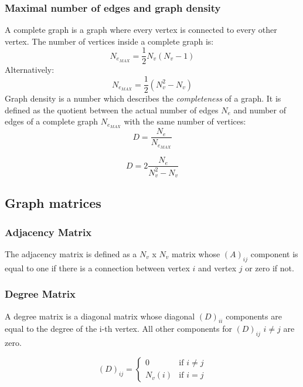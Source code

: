 \documentclass[a4paper,twoside, openright,12pt]{report}
\begin{document}
\subsubsection{Maximal number of edges and graph density}
A complete graph is a graph where every vertex is connected to every other vertex. 
The number of vertices inside a complete graph is:
\begin{equation}
 N_{e_{MAX}} = \frac{1}{2} N_v \left( N_v - 1  \right)
\end{equation}  
Alternatively:
\begin{equation}
 N_{e_{MAX}} = \frac{1}{2} \left( {N_v^2 - N_v } \right)
\end{equation}  
Graph density is a number which describes the \textit{completeness} of a graph. It is defined as the
quotient between the actual number of edges $N_e$ and number of edges of a complete graph $N_{e_{MAX}}$ with the same number of vertices: 
\begin{equation}
 D = \frac{N_e}{N_{e_{MAX}}}
\end{equation} 

\begin{equation}
 D = 2\frac{N_e}{N_v^2 - N_v}
\end{equation} 

\subsection{Graph matrices}
\subsubsection{Adjacency Matrix}
The adjacency matrix is defined as a $N_v$ x $N_v$ matrix whose $(A)_{ij}$ component is equal to one if there is a connection between vertex $i$ and vertex $j$ or zero if not.

\subsubsection{Degree Matrix}
A degree matrix is a diagonal matrix whose diagonal $(D)_{ii}$ components are equal to the degree of the i-th vertex.
All other components for $(D)_{ij}$ $i \ne j$ are zero.

\begin{equation}
  (D)_{ij} = \left\{ \begin{array}{ll}
0  & \mbox{if $i \ne j$} \\
N_v(i) & \mbox{if $i = j$}
                \end{array} \right. 
\end{equation}
\end{document}

